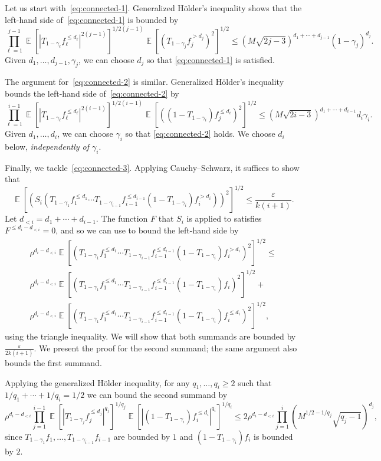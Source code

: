 \documentclass{article}
\theoremstyle{definition}
\theoremstyle{remark}
\DeclareMathOperator*{\E}{\mathbb{E}}
\newcommand\eps{\varepsilon}
\renewcommand\epsilon{\eps}
\renewcommand\geq{\geqslant}
\renewcommand\leq{\leqslant}
\begin{document}
Let us start with~\eqref{eq:connected-1}. Generalized H\"older's inequality shows that the left-hand side of~\eqref{eq:connected-1} is bounded by
\[
 \prod_{\ell=1}^{j-1} \E[|T_{1-\gamma_\ell} f_\ell^{\leq d_\ell}|^{2(j-1)}]^{1/2(j-1)} \E[(T_{1-\gamma_j} f_j^{>d_j})^2]^{1/2} \leq
 (M\sqrt{2j-3})^{d_1 + \cdots + d_{j-1}} (1-\gamma_j)^{d_j}.
\]
Given $d_1,\ldots,d_{j-1},\gamma_j$, we can choose $d_j$ so that \eqref{eq:connected-1} is satisfied.

The argument for~\eqref{eq:connected-2} is similar. Generalized H\"older's inequality bounds the left-hand side of~\eqref{eq:connected-2} by
\[
 \prod_{\ell=1}^{i-1} \E[|T_{1-\gamma_\ell} f_\ell^{\leq d_\ell}|^{2(i-1)}]^{1/2(i-1)} \E[((1-T_{1-\gamma_i}) f_j^{\leq d_i})^2]^{1/2} \leq
 (M\sqrt{2i-3})^{d_1 + \cdots + d_{i-1}} d_i \gamma_i.
\]
Given $d_1,\ldots,d_i$, we can choose $\gamma_i$ so that \eqref{eq:connected-2} holds. We choose $d_i$ below, \emph{independently of $\gamma_i$}.

Finally, we tackle~\eqref{eq:connected-3}. Applying Cauchy--Schwarz, it suffices to show that
\[
 \E[(S_i (T_{1-\gamma_1} f_1^{\leq d_1} \cdots T_{1-\gamma_{i-1}} f_{i-1}^{\leq d_{i-1}} (1-T_{1-\gamma_i}) f_i^{> d_i}))^2]^{1/2} \leq \frac{\epsilon}{k(i+1)}.
\]
Let $d_{<i} = d_1 + \cdots + d_{i-1}$. The function $F$ that $S_i$ is applied to satisfies $F^{\leq d_i - d_{<i}} = 0$, and so we can use  to bound the left-hand side by
\begin{multline*}
 \rho^{d_i - d_{<i}}
  \E[(T_{1-\gamma_1} f_1^{\leq d_1} \cdots T_{1-\gamma_{i-1}} f_{i-1}^{\leq d_{i-1}} (1-T_{1-\gamma_i}) f_i^{> d_i})^2]^{1/2} \leq \\
  \rho^{d_i - d_{<i}} \E[(T_{1-\gamma_1} f_1^{\leq d_1} \cdots T_{1-\gamma_{i-1}} f_{i-1}^{\leq d_{i-1}} (1-T_{1-\gamma_i}) f_i)^2]^{1/2} + \\
  \rho^{d_i - d_{<i}} \E[(T_{1-\gamma_1} f_1^{\leq d_1} \cdots T_{1-\gamma_{i-1}} f_{i-1}^{\leq d_{i-1}} (1-T_{1-\gamma_i}) f_i^{\leq d_i})^2]^{1/2},
\end{multline*}
using the triangle inequality. We will show that both summands are bounded by $\frac{\epsilon}{2k(i+1)}$. We present the proof for the second summand; the same argument also bounds the first summand.

Applying the generalized H\"older inequality, for any $q_1,\ldots,q_i \geq 2$ such that $1/q_1 + \cdots + 1/q_i = 1/2$ we can bound the second summand by
\[
 \rho^{d_i - d_{<i}}\prod_{j=1}^{i-1} \E[|T_{1-\gamma_j} f_j^{\leq d_j}|^{q_j}]^{1/q_j}
 \E[|(1-T_{1-\gamma_i}) f_i^{\leq d_i}|^{q_i}]^{1/q_i}
 \leq
 2\rho^{d_i - d_{<i}}\prod_{j=1}^i (M^{1/2-1/q_j} \sqrt{q_j-1})^{d_j},
\]
since $T_{1-\gamma_1} f_1,\ldots,T_{1-\gamma_{i-1}}f_{i-1}$ are bounded by $1$ and $(1-T_{1-\gamma_i}) f_i$ is bounded by $2$.
\end{document}
